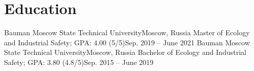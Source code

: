 

\section{Education}\label{sec:education}
\resumeSubHeadingListStart
\resumeSubheading
{Bauman Moscow State Technical University}{Moscow, Russia}
{Master of Ecology and Industrial Safety; GPA: 4.00 (5/5)}{Sep. 2019 -- June 2021}
\resumeSubheading
{Bauman Moscow State Technical University}{Moscow, Russia}
{Bachelor of Ecology and Industrial Safety; GPA: 3.80 (4.8/5)}{Sep. 2015 -- June 2019}
\resumeSubHeadingListEnd